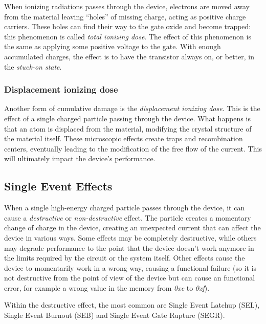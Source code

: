 When ionizing radiations passes through the device, electrons are moved away from the material leaving 
``holes'' of missing charge, acting as positive charge carriers. These holes can find their way to the gate oxide and become trapped: this phenomenon is called \textit{total ionizing dose}. The effect of this phenomenon is the same as applying some positive voltage to the gate. With enough accumulated charges, the effect is to have the transistor always on, or better, in the \textit{stuck-on state}. \bigskip

\subsubsection{Displacement ionizing dose}
Another form of cumulative damage is the \textit{displacement ionizing dose}. This is the effect of a single charged particle passing through the device. What happens is that an atom is displaced from the material, modifying the crystal structure of the material itself. These microscopic effects create traps and recombination centers, eventually leading to the modification of the free flow of the current. This will ultimately impact the device's performance. \bigskip

\subsection{Single Event Effects}
When a single high-energy charged particle passes through the device, it can cause a \textit{destructive} or \textit{non-destructive} effect. The particle creates a momentary change of charge in the device, creating an unexpected current that can affect the device in various ways. Some effects may be completely destructive, while others may degrade performance to the point that the device doesn't work anymore in the limits required by the circuit or the system itself. Other effects cause the device to momentarily work in a wrong way, causing a functional failure (so it is not destructive from the point of view of the device but can cause an functional error, for example a wrong value in the memory from \textit{0xe} to \textit{0xf}). \bigskip

Within the destructive effect, the most common are Single Event Latchup (SEL), Single Event Burnout (SEB) and Single Event Gate Rupture (SEGR).

